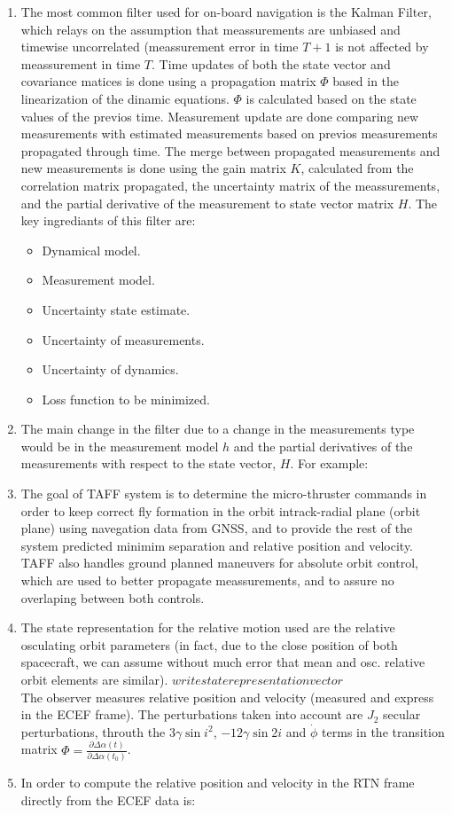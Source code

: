 \documentclass[a4paper]{article}
\begin{document}
\begin{enumerate}
  \item The most common filter used for on-board navigation is the Kalman Filter, which relays on the assumption that meassurements are unbiased and timewise uncorrelated (meassurement error in time $T+1$ is not affected by meassurement in time $T$. Time updates of both the state vector and covariance matices is done using a propagation matrix $\Phi$ based in the linearization of the dinamic equations. $\Phi$ is calculated based on the state values of the previos time. Measurement update are done comparing new measurements with estimated measurements based on previos measurements propagated through time. The merge between propagated measurements and new measurements is done using the gain matrix $K$, calculated from the correlation matrix propagated, the uncertainty matrix of the meassurements, and the partial derivative of the measurement to state vector matrix $H$. The key ingrediants of this filter are:
    \begin{itemize}
      \item Dynamical model.
      \item Measurement model.
      \item Uncertainty state estimate.
      \item Uncertainty of measurements.
      \item Uncertainty of dynamics.
      \item Loss function to be minimized.
    \end{itemize}

  \item The main change in the filter due to a change in the measurements type would be in the measurement model $h$ and the partial derivatives of the measurements with respect to the state vector, $H$. For example:
    
  \item The goal of TAFF system is to determine the micro-thruster commands in order to keep correct fly formation in the orbit intrack-radial plane (orbit plane) using navegation data from GNSS, and to provide the rest of the system predicted minimim separation and relative position and velocity. TAFF also handles ground planned maneuvers for absolute orbit control, which are used to better propagate meassurements, and to assure no overlaping between both controls.
  \item The state representation for the relative motion used are the relative osculating orbit parameters (in fact, due to the close position of both spacecraft, we can assume without much error that mean and osc. relative orbit elements are similar).
    $write state representation vector$\\
    The observer measures relative position and velocity (measured and express in the ECEF frame). The perturbations taken into account are $J_2$ secular perturbations, throuth the $3\gamma\sin{i}^2$, $-12\gamma \sin{2i}$ and $\dot{\phi}$ terms in the transition matrix $\Phi=\frac{\partial \Delta \alpha (t)}{\partial \Delta \alpha (t_0)}$.

  \item In order to compute the relative position and velocity in the RTN frame directly from the ECEF data is:
\end{enumerate}
\end{document}
